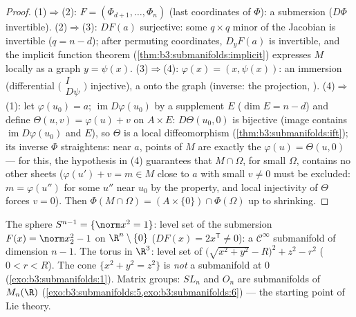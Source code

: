 \begin{proof}
(1)$\Rightarrow$(2): $F = (\Phi_{d+1}, \dots, \Phi_n)$ (last
coordinates of $\Phi$): a submersion ($D\Phi$ invertible).
(2)$\Rightarrow$(3): $DF(a)$ surjective: some $q \times q$
minor of the Jacobian is invertible ($q = n - d$); after
permuting coordinates, $D_yF(a)$ is invertible, and the
implicit function theorem (\cref{thm:b3:submanifolds:implicit})
expresses $M$ locally as a graph $y = \psi(x)$.
(3)$\Rightarrow$(4): $\varphi(x) = (x, \psi(x))$: an
immersion (differential $\bigl(\begin{smallmatrix}I\\
D\psi\end{smallmatrix}\bigr)$ injective), a  onto
the graph (inverse: the projection, ).
(4)$\Rightarrow$(1): let $\varphi(u_0) = a$; 
$\operatorname{im}D\varphi(u_0)$ by a supplement $E$
($\dim E = n - d$) and define $\Theta(u, v) = \varphi(u) + v$
on $A\times E$: $D\Theta(u_0, 0)$ is bijective (image
contains $\operatorname{im}D\varphi(u_0)$ and $E$), so
$\Theta$ is a local diffeomorphism
(\cref{thm:b3:submanifolds:ift}); its inverse $\Phi$
straightens: near $a$, points of $M$ are exactly the
$\varphi(u) = \Theta(u, 0)$ --- for this, the 
hypothesis in (4) guarantees that $M\cap\Omega$, for small
$\Omega$, contains no other sheets ($\varphi(u') + v = m \in
M$ close to $a$ with small $v \neq 0$ must be excluded:
$m = \varphi(u'')$ for some $u''$ near $u_0$ by the
 property, and local injectivity of $\Theta$
forces $v = 0$). Then $\Phi(M\cap\Omega) = (A\times\{0\})
\cap\Phi(\Omega)$ up to shrinking.
\end{proof}

\begin{example}\label{ex:b3:submanifolds:examples}
The sphere $S^{n-1} = \{\norm x^2 = 1\}$: level set of the
submersion $F(x) = \norm x_2^2 - 1$ on
$\R^n\setminus\{0\}$ ($DF(x) = 2x^{\mathsf T} \ne 0$):
a $\mathcal C^\infty$ submanifold of dimension $n - 1$. The
torus in $\R^3$: level set of $\bigl(\sqrt{x^2 + y^2} -
R\bigr)^2 + z^2 - r^2$ ($0 < r < R$). The cone $\{x^2 + y^2 =
z^2\}$ is \emph{not} a submanifold at $0$
(\cref{exo:b3:submanifolds:1}). Matrix groups: $SL_n$ and
$O_n$ are submanifolds of $M_n(\R)$
(\cref{exo:b3:submanifolds:5,exo:b3:submanifolds:6}) --- the
starting point of Lie theory.
\end{example}

